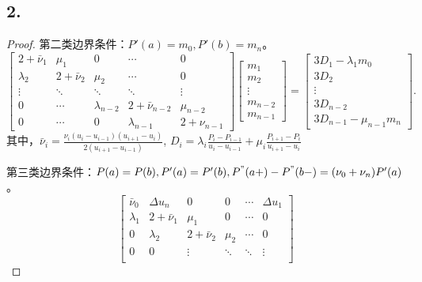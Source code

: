 \documentclass[utf8]{ctexart}
\begin{document}
\subsection*{2.}
\begin{proof}
    \item 第二类边界条件：$P'(a)=m_0,P'(b)=m_n$。
    \begin{equation}
        \begin{bmatrix}
            2+\bar{\nu}_1 & \mu_1 & 0 & \cdots & 0\\
            \lambda_2 & 2+\bar{\nu}_2 & \mu_2 & \cdots & 0\\
            \vdots & \ddots & \ddots & \ddots & \vdots\\
            0 & \cdots & \lambda_{n-2} & 2+\bar{\nu}_{n-2} & \mu_{n-2}\\
            0 & \cdots & 0 & \lambda_{n-1} & 2+\nu_{n-1}
        \end{bmatrix}
        \begin{bmatrix}
            m_1\\
            m_2\\
            \vdots\\
            m_{n-2}\\
            m_{n-1}
        \end{bmatrix} = 
        \begin{bmatrix}
            3D_1 - \lambda_1m_0\\
            3D_2\\
            \vdots\\
            3D_{n-2}\\
            3D_{n-1}-\mu_{n-1}m_n
        \end{bmatrix}.
    \end{equation}
    其中，$\bar{\nu}_i=\frac{\nu_i(u_i-u_{i-1})(u_{i+1}-u_i)}{2(u_{i+1}-u_{i-1})}$,
    $D_i=\lambda_i\frac{P_i-P_{i-1}}{u_i-u_{i-1}} + \mu_i\frac{P_{i+1}-P_i}{u_{i+1}-u_i}$
    \item 第三类边界条件：$P(a)=P(b),P'(a)=P'(b),P^"(a+)-P^"(b-)=(\nu_0+\nu_n)P'(a)$。
    \begin{equation}
        \begin{bmatrix}
            \bar{\nu}_0 & \Delta u_n & 0 & 0 & \cdots & \Delta u_1\\
           \lambda_1 &  2+\bar{\nu}_1 & \mu_1 & 0 & \cdots & 0\\
            0 &\lambda_2 & 2+\bar{\nu}_2 & \mu_2 & \cdots & 0\\
            0 & 0 & \vdots & \ddots & \ddots  & \vdots\\

\end{bmatrix}
\end{equation}
\end{proof}
\end{document}
